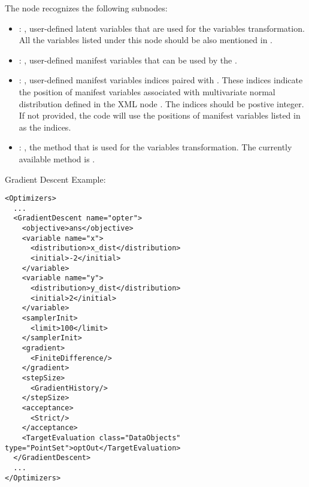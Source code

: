 \begin{itemize}
      The  node recognizes the following subnodes:
      \begin{itemize}
        \item {}: ,
          user-defined latent variables that are used for the variables transformation.
          All the variables listed under this node should be also mentioned in .

        \item {}: ,
          user-defined manifest variables that can be used by the .

        \item {}: ,
          user-defined manifest variables indices paired with .
          These indices indicate the position of manifest variables associated with multivariate
          normal               distribution defined in the XML node .
          The indices should be postive integer. If not provided, the code will use the positions
          of manifest variables listed in  as the indices.

        \item {}: ,
          the method that is used for the variables transformation. The currently available method
          is .
      \end{itemize}
  \end{itemize}

\hspace{24pt}
Gradient Descent Example:
\begin{lstlisting}[style=XML]
<Optimizers>
  ...
  <GradientDescent name="opter">
    <objective>ans</objective>
    <variable name="x">
      <distribution>x_dist</distribution>
      <initial>-2</initial>
    </variable>
    <variable name="y">
      <distribution>y_dist</distribution>
      <initial>2</initial>
    </variable>
    <samplerInit>
      <limit>100</limit>
    </samplerInit>
    <gradient>
      <FiniteDifference/>
    </gradient>
    <stepSize>
      <GradientHistory/>
    </stepSize>
    <acceptance>
      <Strict/>
    </acceptance>
    <TargetEvaluation class="DataObjects" type="PointSet">optOut</TargetEvaluation>
  </GradientDescent>
  ...
</Optimizers>
\end{lstlisting}



